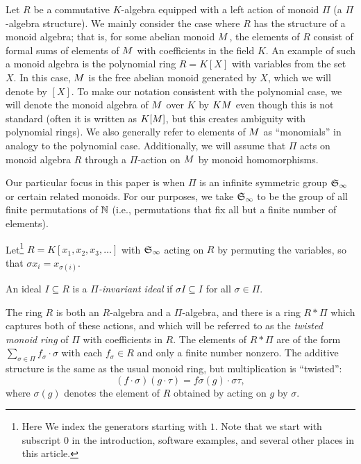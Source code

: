 Let $R$ be a commutative $K$-algebra equipped with a left action of monoid $\Pi$ (a $\Pi$-algebra structure).  We mainly consider the case where $R$ has the structure of a monoid algebra; that is, for some abelian monoid $M$, the elements of $R$ consist of formal sums of elements of $M$ with coefficients in the field $K$.  An example of such a monoid algebra is the polynomial ring $R = K[X]$ with variables from the set $X$.  In this case, $M$ is the free abelian monoid generated by $X$, which we will denote by $[X]$.  To make our notation consistent with the polynomial case, we will denote the monoid algebra of $M$ over $K$ by $KM$ even though this is not standard (often it is written as $K[M]$, but this creates ambiguity with polynomial rings).  We also generally refer to elements of $M$ as ``monomials'' in analogy to the polynomial case.  Additionally, we will assume that $\Pi$ acts on monoid algebra $R$ through a $\Pi$-action on $M$ by monoid homomorphisms.

Our particular focus in this paper is when $\Pi$ is an infinite symmetric group $\mathfrak S_\infty$ or certain related monoids.  For our purposes, we take $\mathfrak S_\infty$ to be the group of all finite permutations of $\mathbb N$ (i.e., permutations that fix all but a finite number of elements).

\begin{example}
 Let\footnote{Here We index the generators starting with $1$. Note that we start with subscript $0$ in the introduction, software examples, and several other places in this article.} $R = K[x_1,x_2,x_3,\ldots]$ with $\mathfrak S_\infty$ acting on $R$ by permuting the variables, so that $\sigma x_i = x_{\sigma(i)}$.
\end{example}

\begin{definition}
 An ideal $I \subseteq R$ is a {\em $\Pi$-invariant ideal} if $\sigma I \subseteq I$ for all $\sigma \in \Pi$.
\end{definition}

The ring $R$ is both an $R$-algebra and a $\Pi$-algebra, and there is a ring $R*\Pi$ which captures both of these actions, and which will be referred to as the {\em twisted monoid ring} of $\Pi$ with coefficients in $R$.  The elements of $R*\Pi$ are of the form $\sum_{\sigma \in \Pi} f_{\sigma}\cdot \sigma$ with each $f_\sigma \in R$ and only a finite number nonzero.  The additive structure is the same as the usual monoid ring, but multiplication is ``twisted'':
 \[ (f\cdot \sigma)(g \cdot \tau) = f\sigma(g) \cdot \sigma\tau,\]
where $\sigma(g)$ denotes the element of $R$ obtained by acting on $g$ by $\sigma$.

